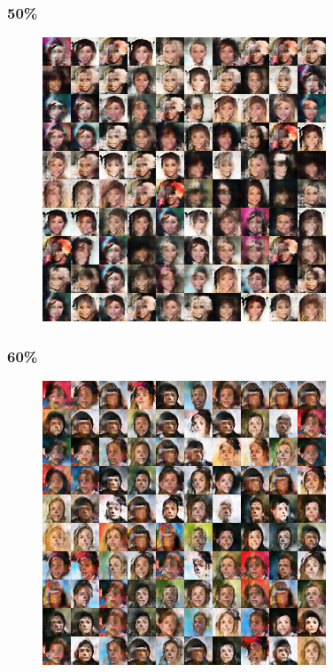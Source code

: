 \documentclass[dvipdfmx,12pt]{beamer}
\begin{document}
\begin{frame}
	\frametitle{50\%}
	\begin{figure}[htbp]
	\begin{center}
	\includegraphics[width=0.7\hsize]{./dcgan/image00050000.png}
	\end{center}
	\end{figure}
\end{frame}
\begin{frame}
	\frametitle{60\%}
	\begin{figure}[htbp]
	\begin{center}
	\includegraphics[width=0.7\hsize]{./dcgan/image00060000.png}
	\end{center}
	\end{figure}
\end{frame}
\end{document}
